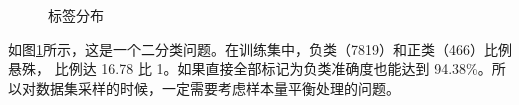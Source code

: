 \documentclass[a4paper]{article}
\begin{document}
\begin{figure}[!h]
  \caption{标签分布} 
  \label{fig:label-dist} %
\end{figure}

如图\ref{fig:label-dist}所示，这是一个二分类问题。在训练集中，负类（7819）和正类（466）比例悬殊，
比例达 16.78 比 1。如果直接全部标记为负类准确度也能达到 94.38\%。所以对数据集采样的时候，一定需要考虑样本量平衡处理的问题。
\end{document}
